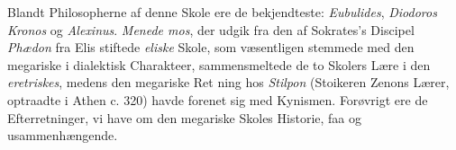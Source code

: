 \documentclass[12pt,a4paper]{book}
\newcommand{\gk}[1]{\textit{#1}}
\begin{document}
Blandt Philosopherne af denne Skole ere de bekjendteste:
\emph{Eubulides}, \emph{Diodoros Kronos} og \emph{Alexinus}. \emph{Menede\-%
mos}, der udgik fra den af Sokrates's Discipel \emph{Phædon} fra
Elis stiftede \emph{eliske} Skole, som væsentligen stemmede med
den megariske i dialektisk Charakteer, sammensmeltede de to
Skolers Lære i den \emph{eretriskes}, medens den megariske Ret\-%
ning hos \emph{Stilpon} (Stoikeren Zenons Lærer, optraadte i Athen
c. 320) havde forenet sig med Kynismen. Forøvrigt ere de
Efterretninger, vi have om den megariske Skoles Historie, faa
og usammenhængende.
\end{document}
